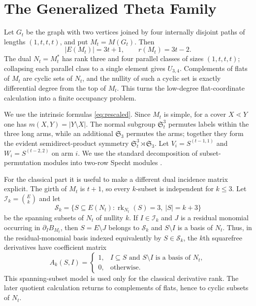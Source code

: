 \documentclass[11pt]{amsart}
\theoremstyle{definition}
\theoremstyle{remark}
\DeclareMathOperator{\rk}{rk}
\newcommand{\del}{\partial}
\begin{document}
\section{The Generalized Theta Family}\label{sec:theta}

Let $G_t$ be the graph with two vertices joined by four internally disjoint paths of lengths $(1,t,t,t)$, and put $M_t=M(G_t)$.  Then
\[
|E(M_t)|=3t+1,\qquad r(M_t)=3t-2.
\]
The dual $N_t=M_t^*$ has rank three and four parallel classes of sizes $(1,t,t,t)$; collapsing each parallel class to a single element gives $U_{3,4}$.  Complements of flats of $M_t$ are cyclic sets of $N_t$, and the nullity of such a cyclic set is exactly differential degree from the top of $M_t$.  This turns the low-degree flat-coordinate calculation into a finite occupancy problem.

We use the intrinsic formulas \eqref{eq:rescaled}.  Since $M_t$ is simple, for a cover $X\lessdot Y$ one has $m(X,Y)=|Y\setminus X|$.  The normal subgroup $\mathfrak S_t^3$ permutes labels within the three long arms, while an additional $\mathfrak S_3$ permutes the arms; together they form the evident semidirect-product symmetry $\mathfrak S_t^3\rtimes\mathfrak S_3$.  Let $V_i=S^{(t-1,1)}$ and $W_i=S^{(t-2,2)}$ on arm $i$.  We use the standard decomposition of subset-permutation modules into two-row Specht modules \cite{James}.

For the classical part it is useful to make a different dual incidence matrix explicit.  The girth of $M_t$ is $t+1$, so every $k$-subset is independent for $k\le3$.  Let $\mathcal I_k=\binom{E}{k}$ and let
\[
\mathcal S_k=\{S\subseteq E(N_t):\rk_{N_t}(S)=3,\ |S|=k+3\}
\]
be the spanning subsets of $N_t$ of nullity $k$.  If $I\in\mathcal I_k$ and $J$ is a residual monomial occurring in $\del_I B_{M_t}$, then $S=E\setminus J$ belongs to $\mathcal S_k$ and $S\setminus I$ is a basis of $N_t$.  Thus, in the residual-monomial basis indexed equivalently by $S\in\mathcal S_k$, the $k$th squarefree derivatives have coefficient matrix
\begin{equation}\label{eq:theta-classical-incidence}
A_k(S,I)=
\begin{cases}
1,&I\subseteq S\text{ and }S\setminus I\text{ is a basis of }N_t,\\
0,&\text{otherwise}.
\end{cases}
\end{equation}
This spanning-subset model is used only for the classical derivative rank.  The later quotient calculation returns to complements of flats, hence to cyclic subsets of $N_t$.
\end{document}
